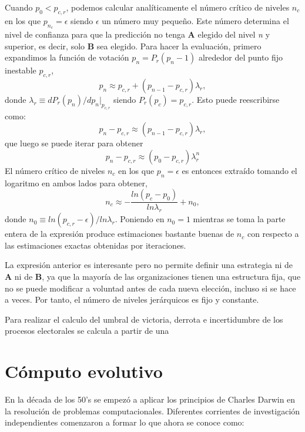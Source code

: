 Cuando $p_{0} < p_{c,r}$, podemos calcular analíticamente el número crítico de niveles $n_{c}$ en los que $p_{n_{c}} = \epsilon$ siendo $\epsilon$ un número muy pequeño. Este número determina el nivel de confianza para que la predicción no tenga \textbf{A} elegido del nivel \textit{n} y superior, es decir, solo \textbf{B} sea elegido. Para hacer la evaluación, primero expandimos la función de votación $p_{n} = P_{r}(p_{n} - 1)$ alrededor del punto fijo inestable $p_{c,r}$,
\begin{equation}
    p_{n} \approx p_{c,r} + (p_{n - 1} - p_{c,r})\lambda_{r},
\end{equation}
donde $\lambda_{r} \equiv dP_{r}(p_{n})/dp_{n}|_{p_{c,r}}$ siendo $P_{r}(p_{c}) = p_{c,r}$. Esto puede reescribirse como:
\begin{equation}
    p_{n} - p_{c,r} \approx (p_{n - 1} - p_{c,r}) \lambda_{r},
\end{equation}
que luego se puede iterar para obtener
\begin{equation}
    p_{n} - p_{c,r} \approx (p_{0} - p_{c,r})\lambda_{r}^{n}
\end{equation}
El número crítico de niveles $n_{c}$ en los que $p_{n} = \epsilon$ es entonces extraído tomando el logaritmo en ambos lados para obtener,
\begin{equation}
    n_{c} \approx -\frac{ln(p_{c} - p_{0})}{ln \lambda_{r}} + n_{0},
\end{equation}
donde $n_{0} \equiv ln(p_{c,r} - \epsilon)/ln\lambda_{r}$. Poniendo en $n_{0} = 1$ mientras se toma la parte entera de la expresión produce estimaciones bastante buenas de $n_{c}$ con respecto a las estimaciones exactas obtenidas por iteraciones.

La expresión anterior es interesante pero no permite definir una estrategia ni de \textbf{A} ni de \textbf{B}, ya que la mayoría de las organizaciones tienen una estructura fija, que no se puede modificar a voluntad antes de cada nueva elección, incluso si se hace a veces. Por tanto, el número de niveles jerárquicos es fijo y constante.

Para realizar el calculo del umbral de victoria, derrota e incertidumbre de los procesos electorales se calcula a partir de una

\section{Cómputo evolutivo}
En la década de los 50's se empezó a aplicar los principios de Charles Darwin en la resolución de problemas computacionales. Diferentes corrientes de investigación independientes comenzaron a formar lo que ahora se conoce como:

